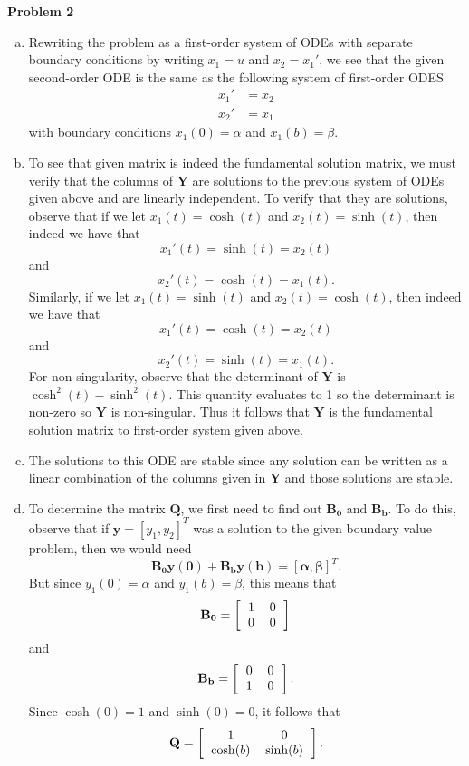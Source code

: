 \documentclass[a4paper, 12pt]{article}
\begin{document}
\begin{center}
	\textbf{Problem 2}
\end{center}

\begin{enumerate}[(a)]
	\item Rewriting the problem as a first-order system of ODEs with separate boundary conditions by writing $x_1 = u$ and $x_2 = x_1'$, we see that the given second-order ODE is the same as the following system of first-order ODES
	\begin{align*}
		x_1' &= x_2 \\
		x_2' &= x_1
	\end{align*}
	with boundary conditions $x_1(0) = \alpha$ and $x_1(b) = \beta$. 

	\item To see that given matrix is indeed the fundamental solution matrix, we must verify that the columns of $\mathbf{Y}$ are solutions to the previous system of ODEs given above and are linearly independent. To verify that they are solutions, observe that if we let $x_1(t) = \cosh(t)$ and $x_2(t) = \sinh(t)$, then indeed we have that 
	\[
		x_1'(t) = \sinh(t) = x_2(t)
	\]
	and 
	\[
		x_2'(t) = \cosh(t) = x_1(t).
	\]
	Similarly, if we let $x_1(t) = \sinh(t)$ and $x_2(t) = \cosh(t)$, then indeed we have that 
	\[
		x_1'(t) = \cosh(t) = x_2(t)
	\]
	and 
	\[
		x_2'(t) = \sinh(t) = x_1(t).
	\]
	For non-singularity, observe that the determinant of $\mathbf{Y}$ is $\cosh^2(t) - \sinh^2(t)$. This quantity evaluates to 1 so the determinant is non-zero so $\mathbf{Y}$ is non-singular. Thus it follows that $\mathbf{Y}$ is the fundamental solution matrix to first-order system given above.

	\item The solutions to this ODE are stable since any solution can be written as a linear combination of the columns given in $\mathbf{Y}$ and those solutions are stable.

	\item To determine the matrix $\mathbf{Q}$, we first need to find out $\mathbf{B_0}$ and $\mathbf{B_b}$. To do this, observe that if $\mathbf{y} = [y_1, y_2]^T$ was a solution to the given boundary value problem, then we would need 
	\[
		\mathbf{B_0 y(0) + B_b y(b) = [\alpha, \beta]}^T.
	\]
	But since $y_1(0) = \alpha$ and $y_1(b) = \beta$, this means that 
	\[
		\mathbf{B_0} =
		\left[
		\begin{tabular}{cc}
		1 & 0\\
		0 & 0
		\end{tabular}
		\right]
	\]
	and
	\[
		\mathbf{B_b} =
		\left[
		\begin{tabular}{cc}
		0 & 0\\
		1 & 0
		\end{tabular}
		\right].
	\]
	Since $\cosh(0) = 1$ and $\sinh(0) = 0$, it follows that
	\[
		\mathbf{Q} = 
		\left[
		\begin{tabular}{cc}
		1 & 0 \\
		$\cosh(b)$ & $\sinh(b)$
		\end{tabular}
		\right].
	\]


\end{enumerate}
\end{document}
